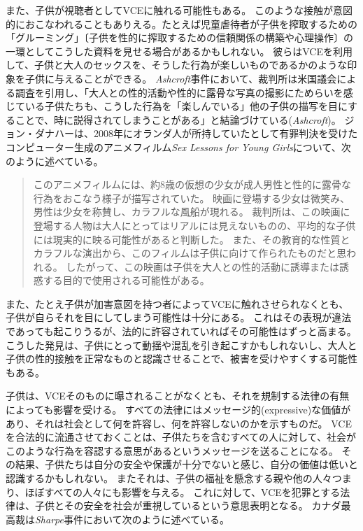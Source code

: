 \documentclass[paper=a4,book,openany]{jlreq} \usepackage{mystyle}
\begin{document}
また、子供が視聴者としてVCEに触れる可能性もある。
このような接触が意図的におこなわれることもありえる。たとえば児童虐待者が子供を搾取するための「グルーミング」〔子供を性的に搾取するための信頼関係の構築や心理操作〕の一環としてこうした資料を見せる場合があるかもしれない。
彼らはVCEを利用して、子供と大人のセックスを、そうした行為が楽しいものであるかのような印象を子供に与えることができる。
\emph{Ashcroft}事件において、裁判所は米国議会による調査を引用し、「大人との性的活動や性的に露骨な写真の撮影にためらいを感じている子供たちも、こうした行為を「楽しんでいる」他の子供の描写を目にすることで、時に説得されてしまうことがある」と結論づけている(\emph{Ashcroft})。
ジョン・ダナハーは、2008年にオランダ人が所持していたとして有罪判決を受けたコンピューター生成のアニメフィルム\emph{Sex Lessons for Young Girls}について、次のように述べている。

\begin{quote}
このアニメフィルムには、約8歳の仮想の少女が成人男性と性的に露骨な行為をおこなう様子が描写されていた。
映画に登場する少女は微笑み、男性は少女を称賛し、カラフルな風船が現れる。
裁判所は、この映画に登場する人物は大人にとってはリアルには見えないものの、平均的な子供には現実的に映る可能性があると判断した。
また、その教育的な性質とカラフルな演出から、このフィルムは子供に向けて作られたものだと思われる。
したがって、この映画は子供を大人との性的活動に誘導または誘惑する目的で使用される可能性がある。\citep[pp.137--138]{strikwerda17:_legal_moral_implic_child_sex_robot}
\end{quote}

また、たとえ子供が加害意図を持つ者によってVCEに触れさせられなくとも、子供が自らそれを目にしてしまう可能性は十分にある。
これはその表現が違法であっても起こりうるが、法的に許容されていればその可能性はずっと高まる。
こうした発見は、子供にとって動揺や混乱を引き起こすかもしれないし、大人と子供の性的接触を正常なものと認識させることで、被害を受けやすくする可能性もある。

子供は、VCEそのものに曝されることがなくとも、それを規制する法律の有無によっても影響を受ける。
すべての法律にはメッセージ的(expressive)な価値があり、それは社会として何を許容し、何を許容しないのかを示すものだ。
VCEを合法的に流通させておくことは、子供たちを含むすべての人に対して、社会がこのような行為を容認する意思があるというメッセージを送ることになる。
その結果、子供たちは自分の安全や保護が十分でないと感じ、自分の価値は低いと認識するかもしれない。
またそれは、子供の福祉を懸念する親や他の人々{\DDASH}つまり、ほぼすべての人々{\DDASH}にも影響を与える。
これに対して、VCEを犯罪とする法律は、子供とその安全を社会が重視しているという意思表明となる。
カナダ最高裁は\emph{Sharpe}事件において次のように述べている。
\end{document}
